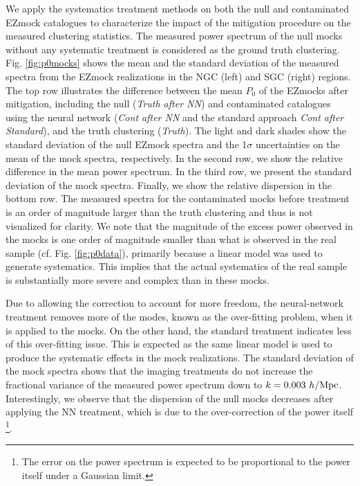 We apply the systematics treatment methods on both the null and contaminated EZmock catalogues to characterize the impact of the mitigation procedure on the measured clustering statistics. The measured power spectrum of the null mocks without any systematic treatment is considered as the ground truth clustering. Fig. \ref{fig:p0mocks} shows the mean and the standard deviation of the measured spectra from the EZmock realizations in the NGC (left) and SGC (right) regions. The top row illustrates the difference between the mean $P_{0}$ of the EZmocks after mitigation, including the null (\textit{Truth after NN}) and contaminated catalogues using the neural network  (\textit{Cont after NN} and the standard approach \textit{Cont after Standard}), and the truth clustering (\textit{Truth}). The light and dark shades show the standard deviation of the null EZmock spectra and the $1\sigma$ uncertainties on the mean of the mock spectra, respectively. In the second row, we show the relative difference in the mean power spectrum. In the third row, we present the standard deviation of the mock spectra. Finally, we show the relative dispersion in the bottom row. The measured spectra for the contaminated mocks before treatment is an order of magnitude larger than the truth clustering and thus is not visualized for clarity. We note that the magnitude of the excess power observed in the mocks is one order of magnitude smaller than what is observed in the real sample (cf. Fig. \ref{fig:p0data}), primarily because a linear model was used to generate systematics. This implies that the actual systematics of the real sample is substantially more severe and complex than in these mocks.

Due to allowing the correction to account for more freedom, the neural-network treatment removes more of the modes, known as the over-fitting problem, when it is applied to the mocks. On the other hand, the standard treatment indicates less of this over-fitting issue. This is expected as the same linear model is used to produce the systematic effects in the mock realizations. The standard deviation of the mock spectra shows that the imaging treatments do not increase the fractional variance of the measured power spectrum down to $k=0.003~h/{\rm Mpc}$. Interestingly, we observe that the dispersion of the null mocks decreases after applying the NN treatment, which is due to the over-correction of the power itself \footnote{The error on the power spectrum is expected to be proportional to the power itself under a Gaussian limit.}.

